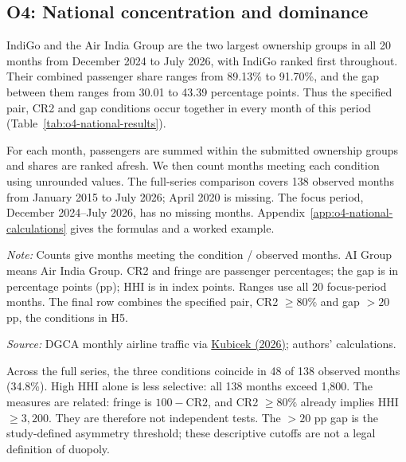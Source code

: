 \documentclass[12pt,a4paper]{article}
\begin{document}
\clearpage
\subsection{O4: National concentration and dominance}
IndiGo and the Air India Group are the two largest ownership groups in all 20 months from December 2024 to July 2026, with IndiGo ranked first throughout. Their combined passenger share ranges from 89.13\% to 91.70\%, and the gap between them ranges from 30.01 to 43.39 percentage points. Thus the specified pair, CR2 and gap conditions occur together in every month of this period (Table~\ref{tab:o4-national-results}).

For each month, passengers are summed within the submitted ownership groups and shares are ranked afresh. We then count months meeting each condition using unrounded values. The full-series comparison covers 138 observed months from January 2015 to July 2026; April 2020 is missing. The focus period, December 2024--July 2026, has no missing months. Appendix~\ref{app:o4-national-calculations} gives the formulas and a worked example.

\begin{minipage}{\linewidth}
\captionsetup{font=small,labelfont=bf,justification=raggedright,singlelinecheck=false,hypcap=false}
\label{tab:o4-national-results}
\centering
{\small{}\setlength{\tabcolsep}{4pt}\par}
\vspace{4pt}
{\footnotesize{}\raggedright\textit{Note:} Counts give months meeting the condition / observed months. AI Group means Air India Group. CR2 and fringe are passenger percentages; the gap is in percentage points (pp); HHI is in index points. Ranges use all 20 focus-period months. The final row combines the specified pair, CR2 $\geq80\%$ and gap $>20$ pp, the conditions in H5.\par
\textit{Source:} DGCA monthly airline traffic via \href{https://github.com/mkubicek/india-aviation-stats/tree/16770ac59dae61ce7b80fd8bd67dd7f4cef280a6}{Kubicek (2026)}; authors' calculations.\par}
\end{minipage}

Across the full series, the three conditions coincide in 48 of 138 observed months (34.8\%). High HHI alone is less selective: all 138 months exceed 1,800. The measures are related: fringe is $100-\mathrm{CR2}$, and CR2 $\geq80\%$ already implies HHI $\geq3{,}200$. They are therefore not independent tests. The $>20$ pp gap is the study-defined asymmetry threshold; these descriptive cutoffs are not a legal definition of duopoly.
\end{document}
